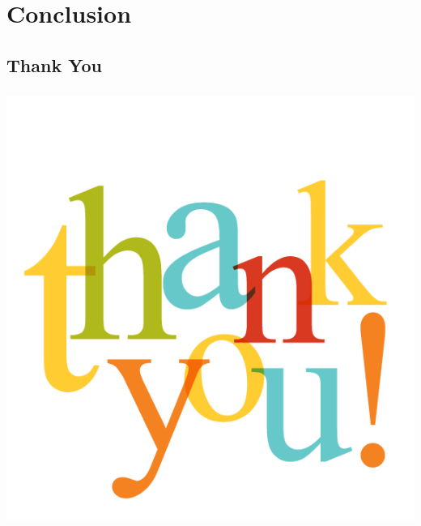 \documentclass[xcolor=dvipsnames, hyperref=hidelinks, url=hyphens]{beamer}
\begin{document}
\section{Conclusion}
\subsection{Thank You}
\begin{frame}\frametitle{}
  \centering
  \includegraphics[scale=0.3]{images/thankyou}
  
\end{frame}
\end{document}
